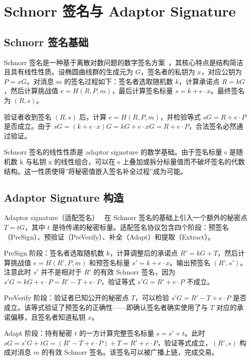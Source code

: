 \section{Schnorr 签名与 Adaptor Signature}


\subsection{Schnorr 签名基础}


Schnorr 签名是一种基于离散对数问题的数字签名方案~\cite{schnorr1991efficient}，其核心特点是结构简洁且具有线性性质。设椭圆曲线群的生成元为 \(G\)，签名者的私钥为 \(x\)，对应公钥为 \(P = xG\)。对消息 \(m\) 的签名过程如下：签名者选取随机数 \(k\)，计算承诺点 \(R = kG\)，然后计算挑战值 \(e = H(R, P, m)\)，最后计算签名标量 \(s = k + e \cdot x\)。最终签名为 \((R, s)\)。


验证者收到签名 \((R, s)\) 后，计算 \(e = H(R, P, m)\)，并检验等式 \(sG = R + e \cdot P\) 是否成立。由于 \(sG = (k + e \cdot x)G = kG + e \cdot xG = R + e \cdot P\)，合法签名必然通过验证。


Schnorr 签名的线性性质是 adaptor signature 的数学基础。由于签名标量 s 是随机数 k 与私钥 x 的线性组合，可以在 s 上叠加或拆分标量值而不破坏签名的代数结构。这一性质使得”将秘密值嵌入签名补全过程”成为可能。


\subsection{Adaptor Signature 构造}


Adaptor signature（适配签名）~\cite{9833731} 在 Schnorr 签名的基础上引入一个额外的秘密点 \(T = tG\)，其中 \(t\) 是待传递的秘密标量。适配签名协议包含四个阶段：预签名（PreSign）、预验证（PreVerify）、补全（Adapt）和提取（Extract）。


PreSign 阶段：签名者选取随机数 \(k\)，计算调整后的承诺点 \(R' = kG + T\)，然后计算挑战值 \(e = H(R', P, m)\) 和预签名标量 \(s' = k + e \cdot x\)。输出预签名 \((R', s')\)。注意此时 \(s'\) 并不是相对于 \(R'\) 的有效 Schnorr 签名，因为 \(s'G = kG + e \cdot P = R' - T + e \cdot P\)，验证等式 \(s'G = R' + e \cdot P\) 不成立。


PreVerify 阶段：验证者已知公开的秘密点 \(T\)，可以检验 \(s'G = R' - T + e \cdot P\) 是否成立。该等式验证了预签名的正确性——即确认签名者确实使用了与 \(T\) 对应的承诺偏移，且签名者知道私钥 \(x\)。


Adapt 阶段：持有秘密 \(t\) 的一方计算完整签名标量 \(s = s' + t\)。此时 \(sG = s'G + tG = (R' - T + e \cdot P) + T = R' + e \cdot P\)，验证等式成立，\((R', s)\) 构成对消息 \(m\) 的有效 Schnorr 签名。该签名可以被广播上链，完成交易。


